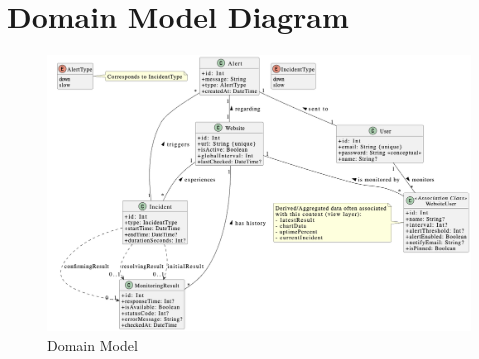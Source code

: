 \section{Domain Model Diagram}
\label{app:er_diagram}

\begin{figure}[H]
        \centering
        \includegraphics[width=\textwidth]{figures/diagrams/domainmodel.png}
        \caption{Domain Model}
        \label{fig:domain_model}
\end{figure}